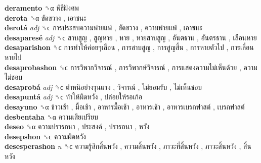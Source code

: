 \textbf{deramento} ␝α   พิธีฝังศพ   \\
\textbf{derota} ␝α   ขัดขวาง ,  เอาชนะ   \\
\textbf{derotá} \emph{adj}  ␝ϲ   การประสบความพ่ายแพ้ ,  ขัดขวาง ,  ความพ่ายแพ้ ,  เอาชนะ   \\
\textbf{desaparesé} \emph{adj}  ␝ϲ   สาบสูญ ,  สูญหาย ,  หาย ,  หายสาบสูญ ,  อันตธาน ,  อันตรธาน ,  เลือนหาย   \\
\textbf{desaparishon} ␝ϲ   การทำให้ค่อยๆเลือน ,  การสาบสูญ ,  การสูญสิ้น ,  การหายตัวไป ,  การเลื่อนหายไป   \\
\textbf{desaprobashon} ␝ϲ   การวิพากวิจารณ์ ,  การวิพากษ์วิจารณ์ ,  การแสดงความไม่เห็นด้วย ,  ความไม่ชอบ   \\
\textbf{desaprobá} \emph{adj}  ␝ϲ   ตำหนิอย่างรุนแรง ,  วิจารณ์ ,  ไม่ยอมรับ ,  ไม่เห็นชอบ   \\
\textbf{desapuntá} \emph{adj}  ␝ϲ   ทำให้ผิดหวัง ,  ปล่อยให้รอเก้อ   \\
\textbf{desayuno} ␝α   ข้าวเช้า ,  มื้อเช้า ,  อาหารมื้อเช้า ,  อาหารเช้า ,  อาหารเบรกฟาสต์ ,  เบรกฟาสต์   \\
\textbf{desbentaha} ␝α   ความเสียเปรียบ   \\
\textbf{deseo} ␝α   ความปรารถนา ,  ประสงค์ ,  ปรารถนา ,  หวัง   \\
\textbf{desepshon} ␝ϲ   ความผิดหวัง   \\
\textbf{desesperashon} \emph{n}  ␝ϲ   ความรู้สึกสิ้นหวัง ,  ความสิ้นหวัง ,  ภาวะที่สิ้นหวัง ,  ภาวะสิ้นหวัง ,  สิ้นหวัง   \\
